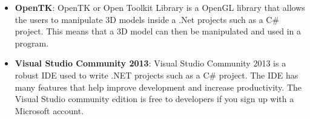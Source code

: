 \begin{itemize}
		\item \textbf{OpenTK}: OpenTK or Open Toolkit Library is a OpenGL library that allows the users to manipulate 3D models inside a .Net projects such as a C\# project. This means that a 3D model can then be manipulated and used in a program.
		
		\item \textbf{Visual Studio Community 2013}: Visual Studio Community 2013 is a robust IDE used to write .NET projects such as a C\#  project. The IDE has many features that help improve development and increase productivity. The Visual Studio community edition is free to developers if you sign up with a Microsoft account.
\end{itemize}
